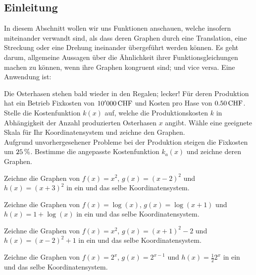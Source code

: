\documentclass[%
11pt,%
twoside,%
titlepage,%
german,%
headsepline%
]{scrartcl}
\begin{document}
\subsection{Einleitung}
  In diesem Abschnitt wollen wir uns Funktionen anschauen, welche insofern miteinander verwandt sind, als dass deren Graphen durch eine Translation, eine Streckung oder eine Drehung ineinander übergeführt werden können. Es geht darum, allgemeine Aussagen über die Ähnlichkeit ihrer Funktionsgleichungen machen zu können, wenn ihre Graphen kongruent sind; und vice versa. Eine Anwendung ist:
  \begin{ueb}
  Die Osterhasen stehen bald wieder in den Regalen; lecker! Für deren Produktion hat ein Betrieb Fixkosten von $\unit[10'000]{CHF}$ und Kosten pro Hase von $\unit[0.50]{CHF}$. Stelle die Kostenfunktion $k(x)$ auf, welche die Produktionskosten $k$ in Abhängigkeit der Anzahl produzierten Osterhasen $x$ angibt. Wähle eine geeignete Skala für Ihr Koordinatensystem und zeichne den Graphen.\\
Aufgrund unvorhergesehener Probleme bei der Produktion steigen die Fixkosten um $\unit[25]{\%}$. Bestimme die angepasste Kostenfunktion $k_a(x)$ und zeichne deren Graphen.

\begin{ueb}
Zeichne die Graphen von $f(x)=x^2$, $g(x)=(x-2)^2$ und $h(x)=(x+3)^2$ in ein und das selbe Koordinatensystem.
\end{ueb}
\begin{ueb}
Zeichne die Graphen von $f(x)=\log(x)$, $g(x)=\log(x+1)$ und $h(x)=1+\log(x)$ in ein und das selbe Koordinatensystem.
\end{ueb}
\begin{ueb}
Zeichne die Graphen von $f(x)=x^2$, $g(x)=(x+1)^2-2$ und $h(x)=(x-2)^2+1$ in ein und das selbe Koordinatensystem.
\end{ueb}
\begin{ueb}
Zeichne die Graphen von $f(x)=2^x$, $g(x)=2^{x-1}$ und $h(x)=\frac{1}{2}2^x$ in ein und das selbe Koordinatensystem.
\end{ueb}
\end{ueb}
\end{document}
